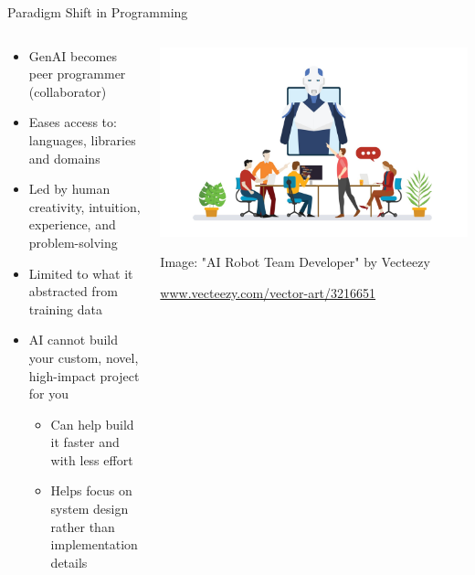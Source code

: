 \documentclass[xcolor=dvipsnames, aspectratio=169]{beamer}
\begin{document}
\begin{frame}{Paradigm Shift in Programming}
  \begin{columns}
    \begin{column}{0.6\textwidth}
      \begin{itemize}
        \item GenAI becomes peer programmer (collaborator)
        \item Eases access to: languages, libraries and domains
        \item Led by human creativity, intuition, experience, and problem-solving
        \item Limited to what it abstracted from training data
        \item AI cannot build your custom, novel, high-impact project for you
        \begin{itemize}
            \item Can help build it faster and with less effort
            \item Helps focus on system design rather than implementation details
          \end{itemize}
      \end{itemize}
    
    \end{column}
    
    \begin{column}{0.4\textwidth}
      \includegraphics[width=\textwidth]{images/376_generated.jpg}
      \tiny\centerline{Image: "AI Robot Team Developer" by Vecteezy}
      \tiny\centerline{\url{www.vecteezy.com/vector-art/3216651}}
    \end{column}
  \end{columns}
\end{frame}
\end{document}

